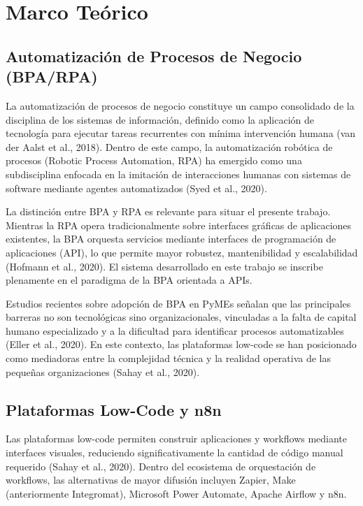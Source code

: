 \documentclass[12pt,a4paper]{report}
\begin{document}
\chapter{Marco Teórico}

\section{Automatización de Procesos de Negocio (BPA/RPA)}

La automatización de procesos de negocio constituye un campo consolidado de la disciplina de los sistemas de información, definido como la aplicación de tecnología para ejecutar tareas recurrentes con mínima intervención humana (van der Aalst et al., 2018). Dentro de este campo, la automatización robótica de procesos (Robotic Process Automation, RPA) ha emergido como una subdisciplina enfocada en la imitación de interacciones humanas con sistemas de software mediante agentes automatizados (Syed et al., 2020).

La distinción entre BPA y RPA es relevante para situar el presente trabajo. Mientras la RPA opera tradicionalmente sobre interfaces gráficas de aplicaciones existentes, la BPA orquesta servicios mediante interfaces de programación de aplicaciones (API), lo que permite mayor robustez, mantenibilidad y escalabilidad (Hofmann et al., 2020). El sistema desarrollado en este trabajo se inscribe plenamente en el paradigma de la BPA orientada a APIs.

Estudios recientes sobre adopción de BPA en PyMEs señalan que las principales barreras no son tecnológicas sino organizacionales, vinculadas a la falta de capital humano especializado y a la dificultad para identificar procesos automatizables (Eller et al., 2020). En este contexto, las plataformas low-code se han posicionado como mediadoras entre la complejidad técnica y la realidad operativa de las pequeñas organizaciones (Sahay et al., 2020).

\section{Plataformas Low-Code y n8n}

Las plataformas low-code permiten construir aplicaciones y workflows mediante interfaces visuales, reduciendo significativamente la cantidad de código manual requerido (Sahay et al., 2020). Dentro del ecosistema de orquestación de workflows, las alternativas de mayor difusión incluyen Zapier, Make (anteriormente Integromat), Microsoft Power Automate, Apache Airflow y n8n.
\end{document}
